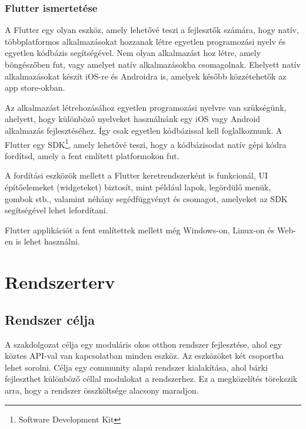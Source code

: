 \documentclass{thesis-ekf}
\theoremstyle{definition}
\theoremstyle{remark}
\begin{document}
	\subsection{Flutter ismertetése}
	A Flutter egy olyan eszköz, amely lehetővé teszi a fejlesztők számára, hogy natív, többplatformos alkalmazásokat hozzanak létre egyetlen programozási nyelv és egyetlen kódbázis segítségével. Nem olyan alkalmazást hoz létre, amely böngészőben fut, vagy amelyet natív alkalmazásokba csomagolnak. Ehelyett natív alkalmazásokat készít iOS-re és Androidra is, amelyek később közzétehetők az app store-okban.
	
	
	Az alkalmazást létrehozásához egyetlen programozási nyelvre van szükségünk, ahelyett, hogy különböző nyelveket használnánk egy iOS vagy Android alkalmazás fejlesztéséhez. Így csak egyetlen kódbázissal kell foglalkoznunk. A Flutter egy SDK\footnote{Software Development Kit}, amely lehetővé teszi, hogy a kódbázisodat natív gépi kódra fordítsd, amely a fent említett platformokon fut.
	
	
	A fordítási eszközök mellett a Flutter keretrendszerként is funkcionál, UI építőelemeket (widgeteket) biztosít, mint például lapok, legördülő menük, gombok stb., valamint néhány segédfüggvényt és csomagot, amelyeket az SDK segítségével lehet lefordítani.\cite{bib_flutter_short}
	
	Flutter applikációt a fent említettek mellett még Windows-on, Linux-on és Web-en is lehet használni.
	\chapter{Rendszerterv}
	\label{ch_rendszert}
	\section{Rendszer célja}
	A szakdolgozat célja egy moduláris okos otthon rendszer fejlesztése, ahol egy köztes API-val van kapcsolatban minden eszköz. Az eszközöket két csoportba lehet sorolni. Célja egy community alapú rendszer kialakítása, ahol bárki fejleszthet különböző céllal modulokat a rendszerhez. Ez a megközelítés törekszik arra, hogy a rendszer összköltsége alacsony maradjon.
\end{document}
